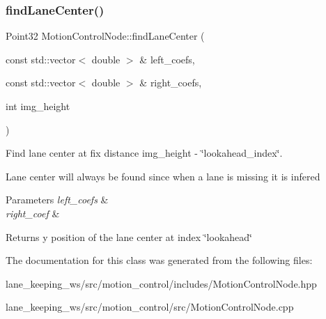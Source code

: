\subsubsection{\texorpdfstring{find\+Lane\+Center()}{findLaneCenter()}}
{\footnotesize\ttfamily Point32 Motion\+Control\+Node\+::find\+Lane\+Center (\begin{DoxyParamCaption}\item[{const std\+::vector$<$ double $>$ \&}]{left\+\_\+coefs,  }\item[{const std\+::vector$<$ double $>$ \&}]{right\+\_\+coefs,  }\item[{int}]{img\+\_\+height }\end{DoxyParamCaption})\hspace{0.3cm}{\ttfamily [private]}}



Find lane center at fix distance img\+\_\+height -\/ \char`\"{}lookahead\+\_\+index\char`\"{}. 

Lane center will always be found since when a lane is missing it is infered


\begin{DoxyParams}{Parameters}
{\em left\+\_\+coefs} & \\
\hline
{\em right\+\_\+coef} & \\
\hline
\end{DoxyParams}
\begin{DoxyReturn}{Returns}
y position of the lane center at index \char`\"{}lookahead\char`\"{} 
\end{DoxyReturn}


The documentation for this class was generated from the following files\+:\begin{DoxyCompactItemize}
\item 
lane\+\_\+keeping\+\_\+ws/src/motion\+\_\+control/includes/Motion\+Control\+Node.\+hpp\item 
lane\+\_\+keeping\+\_\+ws/src/motion\+\_\+control/src/Motion\+Control\+Node.\+cpp\end{DoxyCompactItemize}
